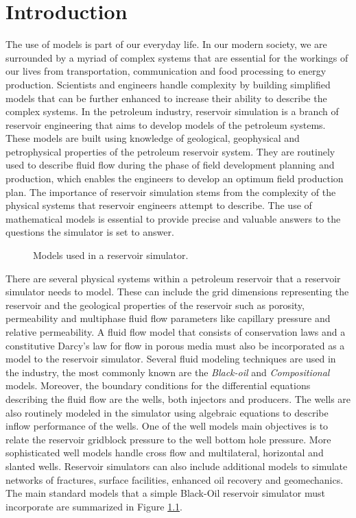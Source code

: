 \chapter{Introduction}
The use of models is part of our everyday life. In our modern society, we are surrounded by a myriad of complex systems that are
essential for the workings of our lives from transportation, communication and food processing to energy production. Scientists and engineers
handle complexity by building simplified models that can be further enhanced to increase their ability to describe the complex systems.
In the petroleum industry, reservoir simulation is a branch of reservoir engineering that aims to develop models of the petroleum systems.
These models are built using knowledge of geological, geophysical and petrophysical properties of the petroleum reservoir system.
They are routinely used to describe fluid flow during the phase of field development planning and production, which enables the engineers 
to develop an optimum field production plan. The importance of reservoir simulation stems from the complexity of the physical systems that reservoir 
engineers attempt to describe. The use of mathematical models is essential to provide precise and valuable answers to the questions the simulator is 
set to answer. 

\begin{figure}[htb]
\centering
\resizebox{15cm}{!}{}
\caption{Models used in a reservoir simulator.}\label{models}
\end{figure}

There are several physical systems within a petroleum reservoir that a reservoir simulator needs to model. 
These can include the grid dimensions representing the reservoir and the geological properties of the reservoir such as porosity, 
permeability and multiphase fluid flow parameters like capillary pressure and relative permeability. A fluid flow model that consists of 
conservation laws and a constitutive Darcy's law for flow in porous media must also be incorporated as a model to the reservoir simulator.
Several fluid modeling techniques are used in the industry, the most commonly known are the \textit{Black-oil} and \textit{Compositional} models.
Moreover, the boundary conditions for the differential equations describing the fluid flow are the wells, both injectors and producers. 
The wells are also routinely modeled in the simulator using algebraic equations to describe inflow performance of the wells. One of the well models
main objectives is to relate the reservoir gridblock pressure to the well bottom hole pressure. More sophisticated well models handle cross flow and
multilateral, horizontal and slanted wells. Reservoir simulators can also include additional models to simulate networks of fractures, surface facilities,
enhanced oil recovery and geomechanics. The main standard models that a simple Black-Oil reservoir simulator must incorporate are summarized in Figure \ref{models}.

